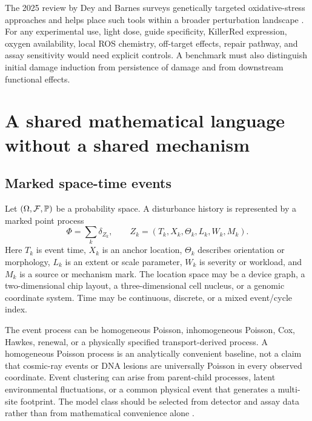 \documentclass[11pt,a4paper,oneside]{article}
\begin{document}
The 2025 review by Dey and Barnes surveys genetically targeted oxidative-stress approaches and helps place such tools within a broader perturbation landscape \citep{Dey2025}. For any experimental use, light dose, guide specificity, KillerRed expression, oxygen availability, local ROS chemistry, off-target effects, repair pathway, and assay sensitivity would need explicit controls. A benchmark must also distinguish initial damage induction from persistence of damage and from downstream functional effects.

\section{A shared mathematical language without a shared mechanism}
\label{sec:model}
\subsection{Marked space-time events}
Let \((\Omega,\mathcal{F},\mathbb{P})\) be a probability space. A disturbance history is represented by a marked point process
\begin{equation}\label{eq:point-process}
\Phi=\sum_{k}\delta_{Z_k},\qquad Z_k=(T_k,X_k,\Theta_k,L_k,W_k,M_k).
\end{equation}
Here \(T_k\) is event time, \(X_k\) is an anchor location, \(\Theta_k\) describes orientation or morphology, \(L_k\) is an extent or scale parameter, \(W_k\) is severity or workload, and \(M_k\) is a source or mechanism mark. The location space may be a device graph, a two-dimensional chip layout, a three-dimensional cell nucleus, or a genomic coordinate system. Time may be continuous, discrete, or a mixed event/cycle index.

The event process can be homogeneous Poisson, inhomogeneous Poisson, Cox, Hawkes, renewal, or a physically specified transport-derived process. A homogeneous Poisson process is an analytically convenient baseline, not a claim that cosmic-ray events or DNA lesions are universally Poisson in every observed coordinate. Event clustering can arise from parent-child processes, latent environmental fluctuations, or a common physical event that generates a multi-site footprint. The model class should be selected from detector and assay data rather than from mathematical convenience alone \citep{LastPenrose2017,MollerWaagepetersen2004}.
\end{document}
